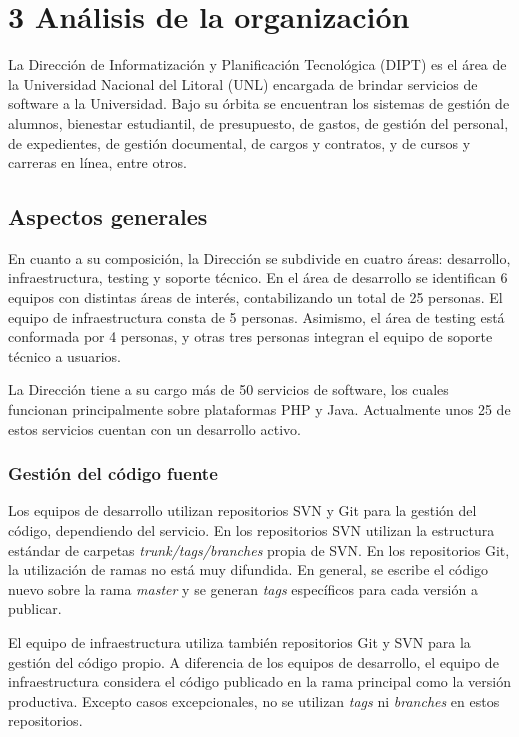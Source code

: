 \section{3 Análisis de la organización}

La Dirección de Informatización y Planificación Tecnológica (DIPT) es el área de la Universidad Nacional del Litoral (UNL) encargada de brindar servicios de software a la Universidad. Bajo su órbita se encuentran los sistemas de gestión de alumnos, bienestar estudiantil, de presupuesto, de gastos, de gestión del personal, de expedientes, de gestión documental, de cargos y contratos, y de cursos y carreras en línea, entre otros.

\subsection{Aspectos generales}

En cuanto a su composición, la Dirección se subdivide en cuatro áreas: desarrollo, infraestructura, testing y soporte técnico. En el área de desarrollo se identifican 6 equipos con distintas áreas de interés, contabilizando un total de 25 personas. El equipo de infraestructura consta de 5 personas. Asimismo, el área de testing está conformada por 4 personas, y otras tres personas integran el equipo de soporte técnico a usuarios.

La Dirección tiene a su cargo más de 50 servicios de software, los cuales funcionan principalmente sobre plataformas PHP y Java. Actualmente unos 25 de estos servicios cuentan con un desarrollo activo.

\subsubsection{Gestión del código fuente}

Los equipos de desarrollo utilizan repositorios SVN y Git para la gestión del código, dependiendo del servicio. En los repositorios SVN utilizan la estructura estándar de carpetas \textit{trunk/tags/branches} propia de SVN. En los repositorios Git, la utilización de ramas no está muy difundida. En general, se escribe el código nuevo sobre la rama \textit{master} y se generan \textit{tags} específicos para cada versión a publicar.

El equipo de infraestructura utiliza también repositorios Git y SVN para la gestión del código propio. A diferencia de los equipos de desarrollo, el equipo de infraestructura considera el código publicado en la rama principal como la versión productiva. Excepto casos excepcionales, no se utilizan \textit{tags} ni \textit{branches} en estos repositorios.

